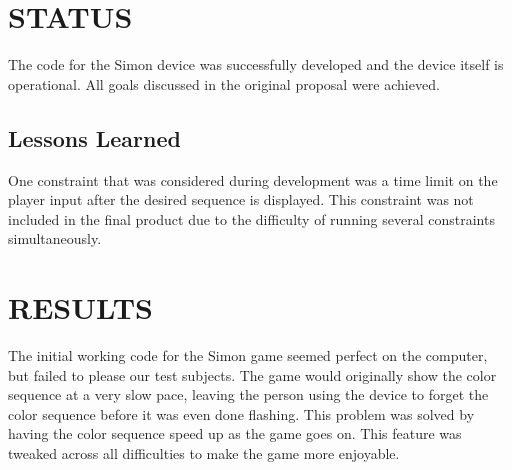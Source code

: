 \documentclass[12pt]{article}
\begin{document}
\section{STATUS} %

The code for the Simon device was successfully developed and the device itself is operational. All goals discussed in the original proposal were achieved.

\subsection{Lessons Learned} %


One constraint that was considered during development was a time limit on the player input after the desired sequence is displayed. This constraint was not included in the final product due to the difficulty of running several constraints simultaneously.

\section{RESULTS} %

The initial working code for the Simon game seemed perfect on the computer, but failed to please our test subjects. The game would originally show the color sequence at a very slow pace, leaving the person using the device to forget the color sequence before it was even done flashing. This problem was solved by having the color sequence speed up as the game goes on. This feature was tweaked across all difficulties to make the game more enjoyable.
\end{document}

